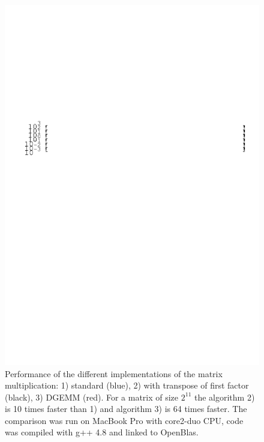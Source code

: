\documentclass[smaller,a4paper,allowframebreaks]{beamer}
\begin{document}
\begin{frame}[allowframebreaks]
\begin{itemize}
\end{itemize}
\end{frame}

\begin{frame}
\begin{figure}
\begin{center}
\includegraphics[width=.9\linewidth]{./images/speedup.pdf}
\caption{Performance of the different implementations of the matrix multiplication: 
1) standard (blue), 2) with transpose of first factor (black), 3) DGEMM (red). 
For a matrix of size $2^{11}$ the algorithm 2) is 10 times faster than 1) and algorithm 3) 
is 64 times faster. The comparison was run on MacBook Pro with core2-duo CPU, 
code was compiled with g++ 4.8 and linked to OpenBlas.}
\end{center}
\end{figure}
\end{frame}
\end{document}
